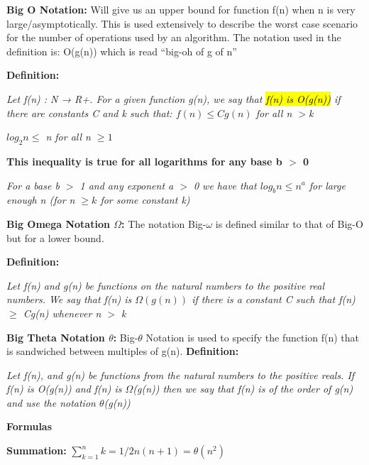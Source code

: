 \documentclass{article}
\begin{document}
\begin{flushleft}
\textbf{Big O Notation:} 
Will give us an upper bound for function f(n) when n is very large/asymptotically. 
This is used extensively to describe the worst case scenario for the number of operations used by an algorithm.
The notation used in the definition is: O(g(n)) which is read “big-oh of g of n”

\textbf{Definition:}\begin{tcolorbox}[enhanced,width=7.5in,center upper,size=fbox,drop shadow southwest,sharp corners]
\textit{Let f(n) : N → R+. For a given function g(n), we say that \hl{f(n) is O(g(n))} if there are constants C and k such that: $f(n) \leq Cg(n)$ for all n $>$k}
\end{tcolorbox}

\begin{tcolorbox}[enhanced,width=2in,center upper,size=fbox,drop shadow southwest,sharp corners]
\textit{$log_2 n \leq$ n for all n $\geq 1$}
\end{tcolorbox}

\textbf{This inequality is true for all logarithms for any base b $>$ 0}
\begin{tcolorbox}[enhanced,width=7.5in,center upper,size=fbox,drop shadow southwest,sharp corners]
\textit{For a base \textit{b} $>$ 1 and any exponent \textit{a} $>$ 0 we have that $log_b n \leq n^a$ for large enough n (for n $\geq k$ for some constant k)}
\end{tcolorbox} 

\vspace{8mm}\textbf{Big Omega Notation $\Omega$:}
The notation Big-$\omega$ is defined similar to that of Big-O but for a lower bound.

\textbf{Definition:}\begin{tcolorbox}[enhanced,width=7.5in,center upper,size=fbox,drop shadow southwest,sharp corners]
\textit{Let f(n) and g(n) be functions on the natural numbers to the positive real numbers. We say that f(n) is $\Omega(g(n))$ if there is a constant C such that f(n) $\geq$ Cg(n) whenever n $>$ k}
\end{tcolorbox}

\vspace{8mm}\textbf{Big Theta Notation $\theta$:}
Big-$\theta$ Notation is used to specify the function f(n) that is sandwiched between multiples of g(n).
\textbf{Definition:}\begin{tcolorbox}[enhanced,width=7.5in,center upper,size=fbox,drop shadow southwest,sharp corners]
\textit{Let f(n), and g(n) be functions from the natural numbers to the positive reals. If f(n) is O(g(n)) and f(n) is $\Omega$(g(n)) then we say that f(n) is of the order of g(n) and use the notation $\theta$(g(n))}
\end{tcolorbox}

\center\textbf{Formulas}

\begin{flushleft}
\vspace{8mm}\textbf{Summation:}
$\displaystyle\sum_{k=1}^{n} k = 1/2 n(n+1) = \theta(n^2)$

\end{flushleft}
\end{flushleft}
\end{document}
